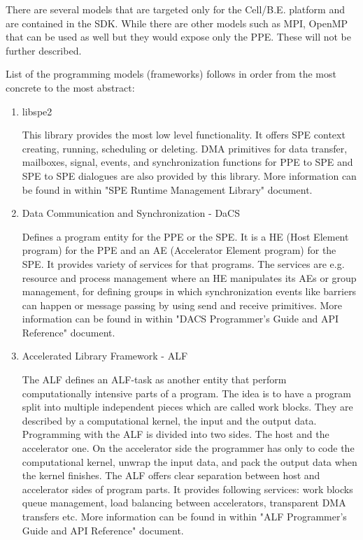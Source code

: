 \par
There are several models that are targeted only for the \mbox{Cell/B.E.} platform and are contained in the SDK.
While there are other models such as MPI, OpenMP that can be used as well but they would expose only the PPE.
These will not be further described.

List of the programming models (frameworks) follows in order from the most concrete to the most abstract:
\begin{enumerate}
\item {libspe2}
\par
This library provides the most low level functionality.
It offers SPE context creating, running, scheduling or deleting.
DMA primitives for data transfer, mailboxes, signal, events, and synchronization functions for PPE to SPE and SPE to SPE dialogues are also provided by this library.
More information can be found in \cite{performanceToolRef} within "SPE Runtime Management Library" document.

\item {Data Communication and Synchronization - DaCS}
\par
Defines a program entity for the PPE or the SPE.
It is a HE (Host Element program) for the PPE and an AE (Accelerator Element program) for the SPE.
It provides variety of services for that programs.
The services are e.g. resource and process management where an HE manipulates its AEs or group management, for defining groups in which synchronization events like barriers can happen or message passing by using send and receive primitives.
More information can be found in \cite{performanceToolRef} within "DACS Programmer's Guide and API Reference" document.

\item {Accelerated Library Framework - ALF}
\par
The ALF defines an ALF-task as another entity that perform computationally intensive parts of a program.
The idea is to have a program split into multiple independent pieces which are called work blocks.
They are described by a computational kernel, the input and the output data.
Programming with the ALF is divided into two sides.
The host and the accelerator one.
On the accelerator side the programmer has only to code the computational kernel, unwrap the input data, and pack the output data when the kernel finishes.
The ALF offers clear separation between host and accelerator sides of program parts.
It provides following services: work blocks queue management, load balancing between accelerators, transparent DMA transfers etc.
More information can be found in \cite{performanceToolRef} within "ALF Programmer's Guide and API Reference" document.

\end{enumerate}

